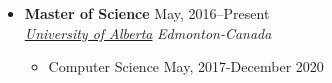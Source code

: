 \documentclass[11pt,a4paper,sans]{moderncv} %
\begin{document}
	\begin{itemize}
		\item \textbf{Master of Science} \hfill May, 2016--Present \\ 
		\href{https://ualberta.ca/}{ \emph{University of Alberta}} \hfill \emph{Edmonton-Canada}
		\begin{itemize}
			\item Computer Science \hspace{10 pt}  \hspace{10 pt}  \hfill  May, 2017-December 2020
		\end{itemize}
		
		
	\end{itemize}
	
\end{document}
